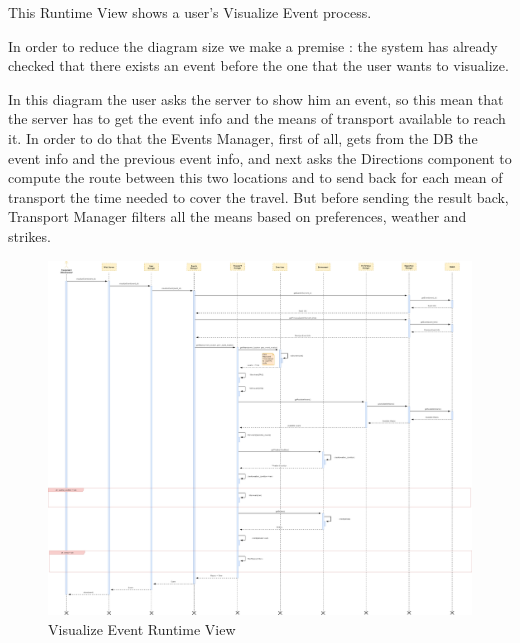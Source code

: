 This Runtime View shows a user's Visualize Event process.\par
In order to reduce the diagram size we make a premise : the system has already checked that there exists an event before the one that the user wants to visualize.\par
In this diagram the user asks the server to show him an event, so this mean that the server has to get the event info and the means of transport available to reach it. In order to do that the Events Manager, first of all, gets from the DB the event info and the previous event info, and next asks the Directions component to compute the route between this two locations and to send back for each mean of transport the time needed to cover the travel.
But before sending the result back, Transport Manager filters all the means based on preferences, weather and strikes.
\begin{figure}[H]
	\centering
	\includegraphics[scale=0.125]{Images/Runtime/Visualize_Event}
	\caption{Visualize Event Runtime View}
\end{figure}

